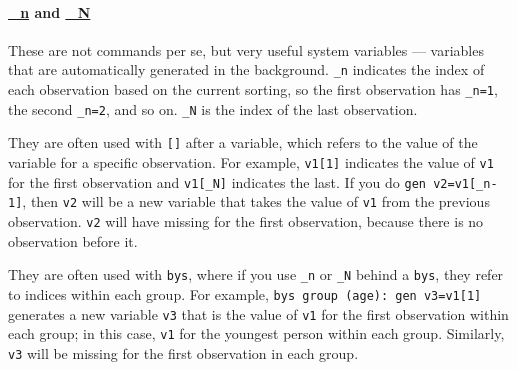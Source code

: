\paragraph{\underline{\_n} and \underline{\_N}} These are not commands per se, but very useful system variables --- variables that are automatically generated in the background. \verb|_n| indicates the index of each observation based on the current sorting, so the first observation has \verb|_n=1|, the second \verb|_n=2|, and so on. \verb|_N| is the index of the last observation. 

They are often used with \verb|[]| after a variable, which refers to the value of the variable for a specific observation. For example, \verb|v1[1]| indicates the value of \verb|v1| for the first observation and \verb|v1[_N]| indicates the last. If you do \verb|gen v2=v1[_n-1]|, then \verb|v2| will be a new variable that takes the value of \verb|v1| from the previous observation. \verb|v2| will have missing for the first observation, because there is no observation before it.  

They are often used with \verb|bys|, where if you use \verb|_n| or \verb|_N| behind a \verb|bys|, they refer to indices within each group. For example, \verb|bys group (age): gen v3=v1[1]| generates a new variable \verb|v3| that is the value of \verb|v1| for the first observation within each group; in this case, \verb|v1| for the youngest person within each group. Similarly, \verb|v3| will be missing for the first observation in each group. 

